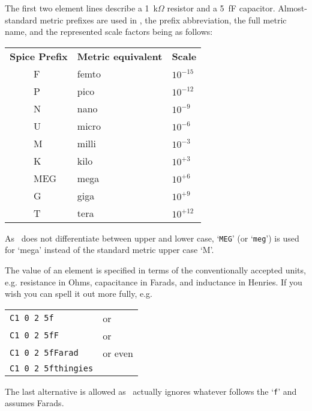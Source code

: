 The first two element lines describe a 1~k$\Omega$ resistor and a 
5~fF capacitor.  Almost-standard metric prefixes are used in
\spice, the prefix abbreviation, the full metric name, and the represented
scale factors being as follows:
\begin{center}
  \begin{tabular}{lll}
{\bf Spice Prefix} & {\bf Metric equivalent} & {\bf Scale} \\
  \ \ \ \ \ F & femto & $10^{-15}$ \\
  \ \ \ \ \ P & pico  & $10^{-12}$ \\
  \ \ \ \ \ N & nano  & $10^{-9}$ \\
  \ \ \ \ \ U & micro & $10^{-6}$ \\
  \ \ \ \ \ M & milli & $10^{-3}$ \\
  \ \ \ \ \ K & kilo  & $10^{+3}$ \\
  \ \ \ \ \ MEG & mega  & $10^{+6}$ \\
  \ \ \ \ \ G & giga  & $10^{+9}$ \\
  \ \ \ \ \ T & tera  & $10^{+12}$ \\
  \end{tabular}
\end{center}
As \spice\ does not differentiate between upper and lower case, `{\tt MEG}'
(or `{\tt meg}')
is used for `mega' instead of the standard metric upper case `M'.

The value of an element is specified in terms of the conventionally
accepted units,
e.g. resistance in Ohms, capacitance in Farads, and inductance in Henries.
If you wish you can spell it out more fully, e.g.
\begin{center}
\begin{tabular}{ll}
{\tt  C1  0  2  5f} & or \\
{\tt  C1  0  2  5fF} & or \\
{\tt C1  0  2  5fFarad}  &or even \\
{\tt C1 0 2 5fthingies} &
\end{tabular}
\end{center}
The last alternative is allowed as
\spice\ actually ignores whatever follows the `{\tt f}' and assumes Farads.

